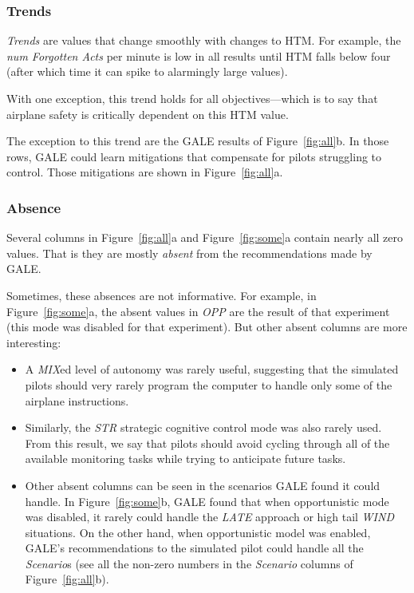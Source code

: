 \documentclass[journal]{IEEEtran}
\newcommand{\bi}{\begin{itemize}}
\newcommand{\ei}{\end{itemize}}
\newcommand{\fig}[1]{Figure~\ref{fig:#1}}
\begin{document}
\subsubsection{Trends}

{\em Trends} are  values that change  smoothly with changes to HTM. For example, the  {\em num Forgotten Acts} per minute is low in all results until HTM falls below four (after which time it can spike to alarmingly large values). 

With one exception, this trend holds for all objectives---which is to say that airplane safety is critically dependent on this HTM value.

The exception to this trend are the GALE results of \fig{all}b.  
In those rows, GALE could learn mitigations that compensate for pilots struggling to control. 
Those mitigations are shown in \fig{all}a. 
 

\subsubsection{Absence}

Several columns in \fig{all}a and \fig{some}a contain nearly all zero values. That is they are mostly {\em absent} from the recommendations made by GALE.

Sometimes, these absences are not informative.  
For example, in \fig{some}a, the absent values in {\em OPP} are the result of that experiment (this mode was disabled for that experiment).
But other absent columns are more interesting:
\bi
\item
A {\em MIX}ed level of autonomy was rarely useful, suggesting that the simulated pilots should very rarely program the computer to handle only some of the airplane instructions.
\item
Similarly, the {\em STR} strategic cognitive control mode was also rarely used.
From this result, we say that pilots should avoid cycling through all of the available monitoring tasks while trying to anticipate future tasks.
\item Other absent columns can be seen in the scenarios GALE found it could handle. 
In \fig{some}b, GALE found that when opportunistic mode was disabled, it rarely could handle the {\em LATE} approach or high tail {\em WIND} situations.  
On the other hand, when opportunistic model was enabled, GALE's recommendations to the simulated pilot could handle all the {\em Scenario}s (see all the non-zero numbers in the {\em Scenario} columns of \fig{all}b).
\ei
\end{document}
